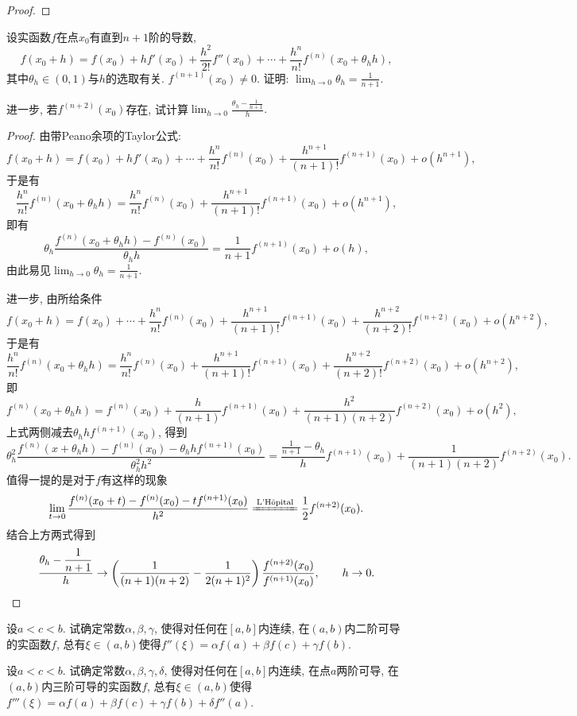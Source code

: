 \begin{quiza}
\begin{proof}
\end{proof}
\woe 设实函数\(f\)在点\(x_0\)有直到\(n+1\)阶的导数,\[f(x_0+h)=f(x_0)+hf'(x_0)+\frac{h^2}{2!}f''(x_0)+\cdots+\frac{h^n}{n!}f^{(n)}(x_0+\theta_hh),\]其中\(\theta_h\in (0,1)\)与\(h\)的选取有关. \(f^{(n+1)}(x_0)\ne 0.\) 证明: \(\lim_{h\rightarrow 0}\theta_h=\frac{1}{n+1}.\)

进一步, 若\(f^{(n+2)}(x_0)\)存在, 试计算\(\lim_{h\rightarrow 0}\frac{\theta_h-\displaystyle\frac{1}{n+1}}{h}.\)
\begin{proof}
由带Peano余项的Taylor公式:\[f(x_0+h)=f(x_0)+hf'(x_0)+\cdots+\frac{h^n}{n!}f^{(n)}(x_0)+\frac{h^{n+1}}{(n+1)!}f^{(n+1)}(x_0)+o(h^{n+1}),\]于是有\[\frac{h^n}{n!}f^{(n)}(x_0+\theta_hh)=\frac{h^n}{n!}f^{(n)}(x_0)+\frac{h^{n+1}}{(n+1)!}f^{(n+1)}(x_0)+o(h^{n+1}),\]即有\[\theta_h\frac{f^{(n)}(x_0+\theta_hh)-f^{(n)}(x_0)}{\theta_hh}=\frac{1}{n+1}f^{(n+1)}(x_0)+o(h),\]由此易见\(\lim_{h\rightarrow 0}\theta_h=\frac{1}{n+1}.\)

进一步, 由所给条件\[f(x_0+h)=f(x_0)+\cdots+\frac{h^n}{n!}f^{(n)}(x_0)+\frac{h^{n+1}}{(n+1)!}f^{(n+1)}(x_0)+\frac{h^{n+2}}{(n+2)!}f^{(n+2)}(x_0)+o(h^{n+2}),\]于是有\[\frac{h^n}{n!}f^{(n)}(x_0+\theta_hh)=\frac{h^n}{n!}f^{(n)}(x_0)+\frac{h^{n+1}}{(n+1)!}f^{(n+1)}(x_0)+\frac{h^{n+2}}{(n+2)!}f^{(n+2)}(x_0)+o(h^{n+2}),\]即\[f^{(n)}(x_0+\theta_hh)=f^{(n)}(x_0)+\frac{h}{(n+1)}f^{(n+1)}(x_0)+\frac{h^2}{(n+1)(n+2)}f^{(n+2)}(x_0)+o(h^{2}),\]上式两侧减去\(\theta_hhf^{(n+1)}(x_0)\), 得到\[\theta^2_h\frac{f^{(n)}(x+\theta_hh)-f^{(n)}(x_0)-\theta_hhf^{(n+1)}(x_0)}{\theta_h^2h^2}=\frac{\displaystyle\frac{1}{n+1}-\theta_h}{h}f^{(n+1)}(x_0)+\frac{1}{(n+1)(n+2)}f^{(n+2)}(x_0).\]
值得一提的是对于\(f\)有这样的现象\[\lim_{t\rightarrow 0}\frac{f^{(n)}(x_0+t)-f^{(n)}(x_0)-tf^{(n+1)}(x_0)}{h^2}\xlongequal{\text{L'H\^{o}pital}}\frac{1}{2}f^{(n+2)}(x_0).\]
结合上方两式得到\[\frac{\theta_h-\displaystyle\frac{1}{n+1}}{h}\rightarrow\left(\frac{1}{(n+1)(n+2)}-\frac{1}{2(n+1)^2}\right)\frac{f^{(n+2)}(x_0)}{f^{(n+1)}(x_0)},\qquad h\rightarrow 0.\qedhere\]
\end{proof}

\woe 设\(a<c<b\). 试确定常数\(\alpha,\beta,\gamma\), 使得对任何在\([a,b]\)内连续, 在\((a,b)\)内二阶可导的实函数\(f\), 总有\(\xi\in(a,b)\)使得\(f''(\xi)=\alpha f(a)+\beta f(c)+\gamma f(b).\)
\begin{solution}
	
\end{solution}
\woe 设\(a<c<b\). 试确定常数\(\alpha,\beta,\gamma,\delta\), 使得对任何在\([a,b]\)内连续, 在点\(a\)两阶可导, 在\((a,b)\)内三阶可导的实函数\(f\), 总有\(\xi\in(a,b)\)使得\(f'''(\xi)=\alpha f(a)+\beta f(c)+\gamma f(b)+\delta f''(a)\).
\end{quiza}
